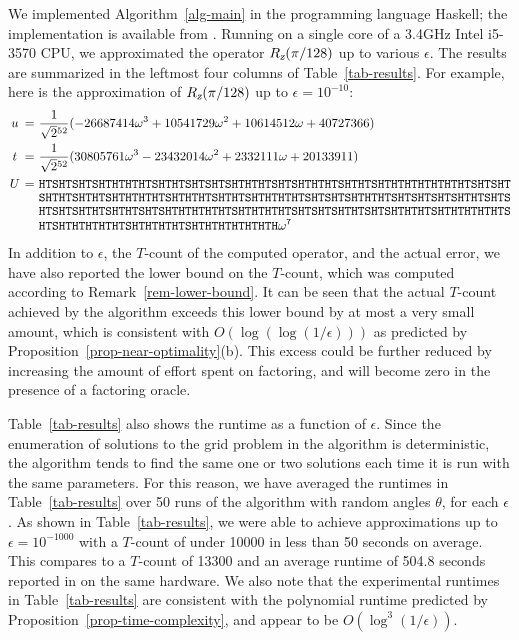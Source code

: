 \documentclass{article}
\begin{document}
We implemented Algorithm~\ref{alg-main} in the programming language
Haskell; the implementation is available from {\cite{implementation}}.
Running on a single core of a 3.4GHz Intel i5-3570 CPU, we
approximated the operator $R_{\textsl{z}}(\pi/128)$ up to various $\epsilon$. The
results are summarized in the leftmost four columns of
Table~\ref{tab-results}.  For example, here is the approximation of
$R_{\textsl{z}}(\pi/128)$ up to $\epsilon=10^{-10}$:
\[ \begin{split}
  \makebox[1em][c]{$u$} =&~ \rtt{52}(-26687414\omega^3+10541729\omega^2+10614512\omega+40727366) \\
  \makebox[1em][c]{$t$} =&~ \rtt{52}(30805761\omega^3-23432014\omega^2+2332111\omega+20133911) \\
  \makebox[1em][c]{$U$} =
  &~ \tt HTSHTSHTSHTHTHTHTSHTHTSHTSHTSHTHTHTSHTSHTHTHTSHTHTSHTHTHTHTHTHTHTSHTSHT\\[-1ex]
  &~ \tt SHTHTSHTHTSHTHTHTHTSHTHTHTSHTHTSHTHTHTHTSHTSHTSHTHTHTSHTSHTSHTSHTHTSHTS\\[-1ex]
  &~ \tt HTSHTSHTHTSHTHTSHTSHTHTHTHTHTSHTHTHTHTSHTSHTSHTHTSHTSHTHTHTSHTHTHTHTHTS\\[-1ex]
  &~ \tt HTSHTHTHTHTHTSHTHTHTHTSHTHTHTHTHTHTH\omega^7
\end{split}
\]
In addition to $\epsilon$, the $T$-count of the computed operator, and
the actual error, we have also reported the lower bound on the
$T$-count, which was computed according to Remark~\ref{rem-lower-bound}.
It can be seen that the actual $T$-count achieved by the algorithm
exceeds this lower bound by at most a very small amount, which is
consistent with $O(\log(\log(1/\epsilon)))$ as predicted by
Proposition~\ref{prop-near-optimality}(b). This excess could be
further reduced by increasing the amount of effort spent on factoring,
and will become zero in the presence of a factoring oracle.

Table~\ref{tab-results} also shows the runtime as a function of
$\epsilon$. Since the enumeration of solutions to the grid problem in
the algorithm is deterministic, the algorithm tends to find the same
one or two solutions each time it is run with the same parameters. For
this reason, we have averaged the runtimes in Table~\ref{tab-results}
over 50 runs of the algorithm with random angles $\theta$, for each
$\epsilon$. As shown in Table~\ref{tab-results}, we were able to
achieve approximations up to $\epsilon=10^{-1000}$ with a $T$-count of
under 10000 in less than 50 seconds on average. This compares to a
$T$-count of 13300 and an average runtime of 504.8 seconds reported in
{\cite{Selinger-newsynth}} on the same hardware. We also note that the
experimental runtimes in Table~\ref{tab-results} are consistent with
the polynomial runtime predicted by
Proposition~\ref{prop-time-complexity}, and appear to be 
$O(\log^3(1/\epsilon))$.
\end{document}
